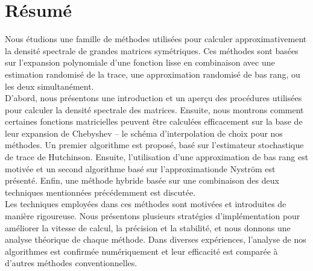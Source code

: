 \chapter*{Résumé}
\label{chp:0-resume}

Nous étudions une famille de méthodes utilisées pour calculer approximativement
la densité spectrale de grandes matrices symétriques. Ces méthodes sont basées
sur l'expansion polynomiale d'une fonction lisse en combinaison avec une estimation randomisé
de la trace, une approximation randomisé de bas rang, ou les deux simultanément.\\

D'abord, nous présentons une introduction et un aperçu des procédures
utilisées pour calculer la densité spectrale des matrices. Ensuite, nous montrons
comment certaines fonctions matricielles peuvent être calculées efficacement sur
la base de leur expansion de Chebyshev -- le schéma d'interpolation de choix pour
nos méthodes. Un premier algorithme est proposé, basé sur l'estimateur stochastique
de trace de Hutchinson. Ensuite, l'utilisation d'une approximation de bas rang
est motivée et un second algorithme basé sur l'approximationde Nystr\"om est présenté.
Enfin, une méthode hybride basée sur une combinaison des deux techniques mentionnées
précédemment est discutée.\\

Les techniques employées dans ces méthodes sont motivées et introduites de manière
rigoureuse. Nous présentons plusieurs stratégies d'implémentation pour améliorer
la vitesse de calcul, la précision et la stabilité, et nous donnons une analyse
théorique de chaque méthode. Dans diverses expériences, l'analyse de nos algorithmes
est confirmée numériquement et leur efficacité est comparée à d'autres méthodes
conventionnelles.
